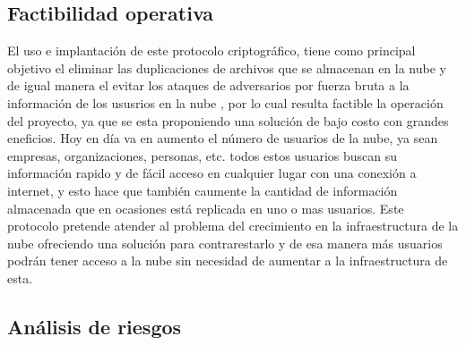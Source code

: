 \subsection{Factibilidad operativa}
El uso e implantación de este protocolo criptográfico, tiene como principal objetivo el eliminar las duplicaciones de archivos que se almacenan en la nube y de igual manera el evitar los ataques de adversarios por fuerza bruta a la información de los ususrios en la nube , por lo cual resulta factible la operación del proyecto, ya que se esta proponiendo una solución de bajo costo con grandes eneficios.
Hoy en día va en aumento el número de usuarios de la nube, ya sean empresas, organizaciones, personas, etc. todos estos usuarios buscan su información rapido y de fácil acceso en cualquier lugar con una conexión a internet, y esto hace que también caumente la cantidad de información almacenada que en ocasiones está replicada en uno o mas usuarios.
Este protocolo pretende atender al problema del crecimiento en la infraestructura de la nube ofreciendo una solución para contrarestarlo y de esa manera más usuarios podrán tener acceso a la nube sin necesidad de aumentar a la infraestructura de esta.



\subsection{Análisis de riesgos} 

